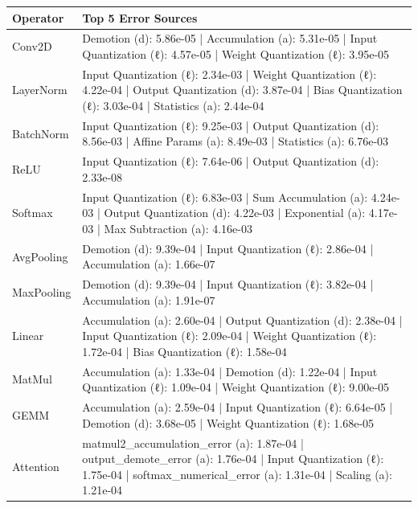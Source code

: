 \caption{Top 5 error sources per operator with 3-component decomposition.}
\label{tab:contribution_detailed}
\begin{tabular}{l p{12cm}}
\toprule
Operator & Top 5 Error Sources \\
\midrule
Conv2D & Demotion (d): 5.86e-05 | Accumulation (a): 5.31e-05 | Input Quantization (ℓ): 4.57e-05 | Weight Quantization (ℓ): 3.95e-05 \\
LayerNorm & Input Quantization (ℓ): 2.34e-03 | Weight Quantization (ℓ): 4.22e-04 | Output Quantization (d): 3.87e-04 | Bias Quantization (ℓ): 3.03e-04 | Statistics (a): 2.44e-04 \\
BatchNorm & Input Quantization (ℓ): 9.25e-03 | Output Quantization (d): 8.56e-03 | Affine Params (a): 8.49e-03 | Statistics (a): 6.76e-03 \\
ReLU & Input Quantization (ℓ): 7.64e-06 | Output Quantization (d): 2.33e-08 \\
Softmax & Input Quantization (ℓ): 6.83e-03 | Sum Accumulation (a): 4.24e-03 | Output Quantization (d): 4.22e-03 | Exponential (a): 4.17e-03 | Max Subtraction (a): 4.16e-03 \\
AvgPooling & Demotion (d): 9.39e-04 | Input Quantization (ℓ): 2.86e-04 | Accumulation (a): 1.66e-07 \\
MaxPooling & Demotion (d): 9.39e-04 | Input Quantization (ℓ): 3.82e-04 | Accumulation (a): 1.91e-07 \\
Linear & Accumulation (a): 2.60e-04 | Output Quantization (d): 2.38e-04 | Input Quantization (ℓ): 2.09e-04 | Weight Quantization (ℓ): 1.72e-04 | Bias Quantization (ℓ): 1.58e-04 \\
MatMul & Accumulation (a): 1.33e-04 | Demotion (d): 1.22e-04 | Input Quantization (ℓ): 1.09e-04 | Weight Quantization (ℓ): 9.00e-05 \\
GEMM & Accumulation (a): 2.59e-04 | Input Quantization (ℓ): 6.64e-05 | Demotion (d): 3.68e-05 | Weight Quantization (ℓ): 1.68e-05 \\
Attention & matmul2_accumulation_error (a): 1.87e-04 | output_demote_error (a): 1.76e-04 | Input Quantization (ℓ): 1.75e-04 | softmax_numerical_error (a): 1.31e-04 | Scaling (a): 1.21e-04 \\
\bottomrule
\end{tabular}
